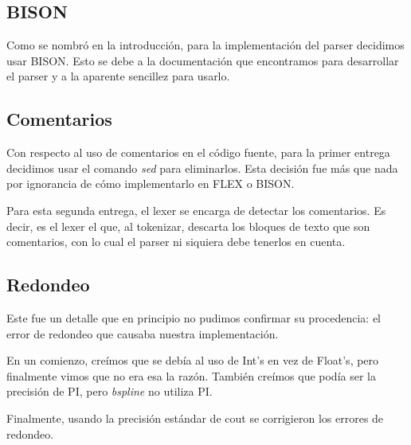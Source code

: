 \subsection{BISON}
Como se nombró en la introducción, para la implementación del parser decidimos usar BISON. Esto se debe a la documentación que encontramos para desarrollar el parser y a la aparente sencillez para usarlo.

\subsection{Comentarios}
Con respecto al uso de comentarios en el código fuente, para la primer entrega decidimos usar el comando \textit{sed} para eliminarlos. Esta decisión fue más que nada por ignorancia de cómo implementarlo en FLEX o BISON. 

Para esta segunda entrega, el lexer se encarga de detectar los comentarios. Es decir, es el lexer el que, al tokenizar, descarta los bloques de texto que son comentarios, con lo cual el parser ni siquiera debe tenerlos en cuenta.


\subsection{Redondeo}
Este fue un detalle que en principio no pudimos confirmar su procedencia: el error de redondeo que causaba nuestra implementación.

En un comienzo, creímos que se debía al uso de Int's en vez de Float's, pero finalmente vimos que no era esa la razón. También creímos que podía ser la precisión de PI, pero \textit{bspline} no utiliza PI.

Finalmente, usando la precisión estándar de cout se corrigieron los errores de redondeo.

